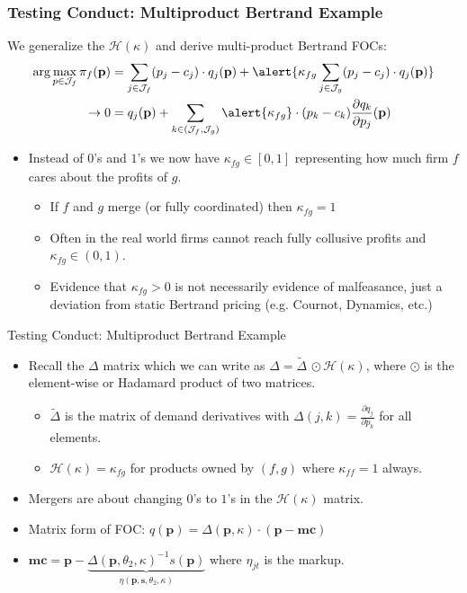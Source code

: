 \begin{frame}
\frametitle{Testing Conduct: Multiproduct Bertrand Example}
\small
We generalize the $\mathcal{H}(\kappa)$ and derive multi-product Bertrand FOCs:
\begin{align*}
\arg \max_{p \in \mathcal{J}_f} \pi_f (\mathbf{p}) &= \sum_{j \in \mathcal{J}_f} (p_j - c_j) \cdot q_j(\mathbf{p}) +  \alert{\kappa_{fg} \sum_{j \in \mathcal{J}_g} (p_j - c_j) \cdot q_j(\mathbf{p})} \\
\rightarrow 0&= q_j(\mathbf{p}) + \sum_{k \in (\mathcal{J}_f,\mathcal{J}_g)} \alert{\kappa_{fg}}\cdot (p_k - c_k) \frac{\partial q_{k}}{\partial p_j}(\mathbf{p}) 
\end{align*}
\begin{itemize}
\item Instead of $0$'s and $1$'s we now have $\kappa_{fg} \in [0,1]$ representing how much firm $f$ cares about the profits of $g$.
\begin{itemize}
\item If $f$ and $g$ merge (or fully coordinated) then $\kappa_{fg} =1$
\item Often in the real world firms cannot reach fully collusive profits and $\kappa_{fg} \in (0,1)$.
\item Evidence that $\kappa_{fg} > 0$ is not necessarily evidence of malfeasance, just a deviation from \alert{static Bertrand pricing} (e.g. Cournot, Dynamics, etc.)
\end{itemize}
\end{itemize}
\end{frame}


\begin{frame}{Testing Conduct: Multiproduct Bertrand Example}
\begin{itemize}
\item Recall the $\Delta$ matrix which we can write as $\Delta=\tilde{\Delta}\, \odot \mathcal{H}(\kappa)$, where $\odot$ is the element-wise or Hadamard product of two matrices. 
\begin{itemize}
\item $\tilde{\Delta}$ is the matrix of demand derivatives with $\Delta{(j,k)} = \frac{\partial q_j}{\partial p_k}$ for all elements.
\item $\mathcal{H}(\kappa)=\kappa_{fg}$ for products owned by $(f,g)$ where $\kappa_{ff}=1$ always.
\end{itemize}
\item Mergers are about changing $0$'s to $1$'s in the $\mathcal{H}(\kappa)$ matrix.
\item Matrix form of FOC: $q(\mathbf{p}) = \Delta(\mathbf{p},\kappa)\cdot(\mathbf{p}-\mathbf{mc})$
\item $\mathbf{mc} =  \mathbf{p} - \underbrace{\Delta(\mathbf{p}, \theta_2, \kappa)^{-1} s(\mathbf{p})}_{\eta(\mathbf{p},\mathbf{s},\theta_2,\kappa)}$
where $\eta_{jt}$ is the markup.
\end{itemize}
\end{frame}

